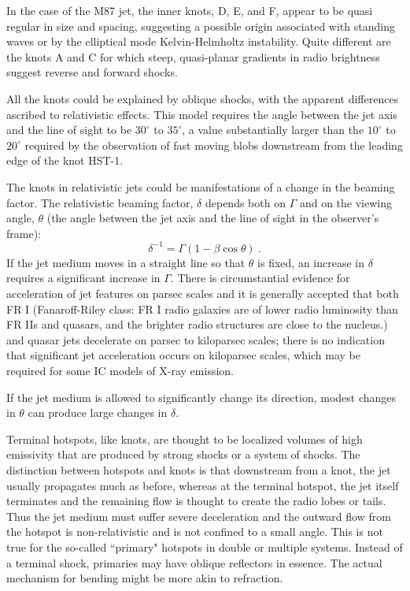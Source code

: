 \documentclass[12pt,a4paper]{article}
\begin{document}
In the case of the M87 jet, the inner knots, D, E, and F, appear to be quasi regular in size and spacing, suggesting a possible origin associated with standing waves or by the elliptical mode Kelvin-Helmholtz instability. Quite different are the knots A and C for which
steep, quasi-planar gradients in radio brightness suggest reverse and forward shocks.

All the knots could be explained by oblique shocks, with the apparent differences ascribed to relativistic effects. This model requires the angle between the jet axis and the line of sight to be $30^\circ$ to $35^\circ$, a value substantially larger than the $10^\circ$ to $20^\circ$ required by the observation of fast moving blobs downstream from the leading edge of the knot HST-1. 

The knots in relativistic jets could be manifestations of a change in the beaming factor. The relativistic beaming factor, $\delta$ depends both on $\Gamma$ and on the viewing angle, $\theta$ (the angle between the jet axis and the line of sight in the observer's frame):
\begin{equation}
\delta^{-1} = \Gamma (1-\beta \cos \theta) ~.
\end{equation}
If the jet medium moves in a straight line so that $\theta$ is fixed, an increase in $\delta$ requires a significant increase in $\Gamma$. There is circumstantial evidence for acceleration of jet features on parsec scales and it is generally accepted that both FR I (Fanaroff-Riley class: FR I radio galaxies are of lower radio luminosity than FR IIs and quasars, and the brighter radio structures are close to the nucleus.) and quasar jets decelerate on parsec to kiloparsec scales; there is no indication that significant jet acceleration occurs on kiloparsec scales, which may be required for some IC models of X-ray emission.

If the jet medium is allowed to significantly change its direction, modest changes in $\theta$ can produce large changes in $\delta$. 

Terminal hotspots, like knots, are thought to be localized volumes of high emissivity that are produced by strong shocks or a system of shocks. The distinction between hotspots and knots is that downstream from a knot, the jet usually propagates much as before, whereas at the terminal hotspot, the jet itself terminates and the remaining flow is thought to create the radio lobes or tails. Thus the jet medium must suffer severe deceleration and the outward flow from the hotspot is non-relativistic and is not confined to a small angle. This is not true for the so-called ``primary" hotspots in double or multiple systems. Instead of a terminal shock, primaries may have oblique reflectors in essence. The actual mechanism for bending might be more akin to refraction. 
\end{document}
